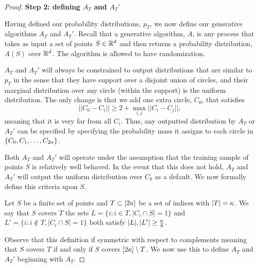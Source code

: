 \begin{proof}
\textbf{Step 2: defining $A_T$ and $A_T'$}

Having defined our probability distributions, $p_T$, we now define our generative algorithms $A_T$ and $A_T'$. Recall that a generative algorithm, $A$, is any process that takes as input a set of points $S \in \mathbb{R}^d$ and then returns a probability distribution, $A(S)$ over $\mathbb{R}^d$. The algorithm is allowed to have randomization. 

$A_T$ and $A_T'$ will always be constrained to output distributions that are similar to $p_T$ in the sense that they have support over a disjoint union of circles, and their marginal distribution over any circle (within the support) is the uniform distribution. The only change is that we add one extra circle, $C_0$, that satisfies $$||C_0 - C_i|| \geq 2 + \max_{i, j} ||C_i - C_j||,$$ meaning that it is very far from all $C_i$. Thus, any outputted distribution by $A_T$ or $A_T'$ can be specified by specifying the probability mass it assigns to each circle in $\{C_0, C_1, \dots, C_{2\kappa}\}$.

Both $A_T$ and $A_T'$ will operate under the assumption that the training sample of points $S$ is relatively well behaved. In the event that this does not hold, $A_T$ and $A_T'$ will output the uniform distribution over $C_0$ as a default. We now formally define this criteria upon $S$.

\begin{definition}\label{defn:covers}
Let $S$ be a finite set of points and $T \subset [2\kappa]$ be a set of indices with $|T| = \kappa$. We say that $S$ covers $T$ the sets $L = \{i: i \in T, |C_i \cap S| = 1\}$ and $L' = \{i: i \notin T, |C_i \cap S| = 1\}$ both satisfy $|L|, |L'| \geq \frac{\kappa}{8}$.
\end{definition}

Observe that this definition if symmetric with respect to complements meaning that $S$ covers $T$ if and only if $S$ covers $[2\kappa] \setminus T$. We now use this to define $A_T$ and $A_T'$ beginning with $A_T$. 




\end{proof}
